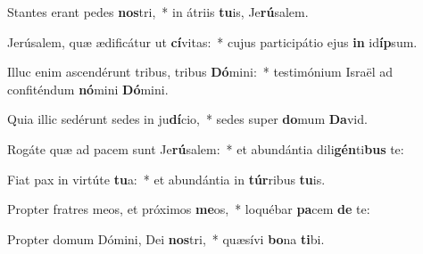 \item Stantes erant pedes \textbf{nos}tri,~* in átriis \textbf{tu}is, Je\textbf{rú}salem.
\item Jerúsalem, quæ ædificátur ut \textbf{cí}vitas:~* cujus participátio ejus \textbf{in} id\textbf{íp}sum.
\item Illuc enim ascendérunt tribus, tribus \textbf{Dó}mini:~* testimónium Israël ad confiténdum \textbf{nó}mini \textbf{Dó}mini.
\item Quia illic sedérunt sedes in ju\textbf{dí}cio,~* sedes super \textbf{do}mum \textbf{Da}vid.
\item Rogáte quæ ad pacem sunt Je\textbf{rú}salem:~* et abundántia dili\textbf{gén}ti\textbf{bus} te:
\item Fiat pax in virtúte \textbf{tu}a:~* et abundántia in \textbf{túr}ribus \textbf{tu}is.
\item Propter fratres meos, et próximos \textbf{me}os,~* loquébar \textbf{pa}cem \textbf{de} te:
\item Propter domum Dómini, Dei \textbf{nos}tri,~* quæsívi \textbf{bo}na \textbf{ti}bi.
